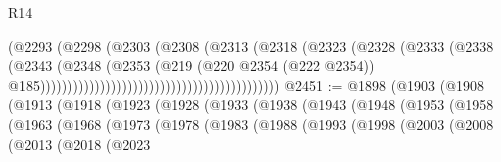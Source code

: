 \begin{lexlean}{R14}
\begin{coremodule}
                                                                (@2293
                                                                  (@2298
                                                                    (@2303
                                                                      (@2308
                                                                        (@2313
                                                                          (@2318
                                                                            (@2323
                                                                              (@2328
                                                                                (@2333
                                                                                  (@2338
                                                                                    (@2343
                                                                                      (@2348
                                                                                        (@2353
                                                                                          (@219
                                                                                            (@220
                                                                                              @2354
                                                                                              (@222
                                                                                                @2354))
                                                                                            @185))))))))))))))))))))))))))))))))))))))))))))
@2451 := @1898
    (@1903
      (@1908
        (@1913
          (@1918
            (@1923
              (@1928
                (@1933
                  (@1938
                    (@1943
                      (@1948
                        (@1953
                          (@1958
                            (@1963
                              (@1968
                                (@1973
                                  (@1978
                                    (@1983
                                      (@1988
                                        (@1993
                                          (@1998
                                            (@2003
                                              (@2008
                                                (@2013
                                                  (@2018
                                                    (@2023

\end{coremodule}
\end{lexlean}
